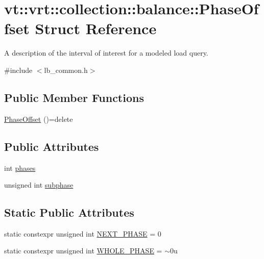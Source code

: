\hypertarget{structvt_1_1vrt_1_1collection_1_1balance_1_1_phase_offset}{}\section{vt\+:\+:vrt\+:\+:collection\+:\+:balance\+:\+:Phase\+Offset Struct Reference}
\label{structvt_1_1vrt_1_1collection_1_1balance_1_1_phase_offset}


A description of the interval of interest for a modeled load query.  




{\ttfamily \#include $<$lb\+\_\+common.\+h$>$}

\subsection*{Public Member Functions}
\begin{DoxyCompactItemize}
\item 
\hyperlink{structvt_1_1vrt_1_1collection_1_1balance_1_1_phase_offset_a3a8f4f20292bf178c5d5902f405f88d6}{Phase\+Offset} ()=delete
\end{DoxyCompactItemize}
\subsection*{Public Attributes}
\begin{DoxyCompactItemize}
\item 
int \hyperlink{structvt_1_1vrt_1_1collection_1_1balance_1_1_phase_offset_a8548a90b20b426e5986f20beb139d3d1}{phases}
\item 
unsigned int \hyperlink{structvt_1_1vrt_1_1collection_1_1balance_1_1_phase_offset_a61facb996e52cae3e9a8c9d4d3091ee0}{subphase}
\end{DoxyCompactItemize}
\subsection*{Static Public Attributes}
\begin{DoxyCompactItemize}
\item 
static constexpr unsigned int \hyperlink{structvt_1_1vrt_1_1collection_1_1balance_1_1_phase_offset_aa8a8c4379ab878392c4f65212e92f581}{N\+E\+X\+T\+\_\+\+P\+H\+A\+SE} = 0
\item 
static constexpr unsigned int \hyperlink{structvt_1_1vrt_1_1collection_1_1balance_1_1_phase_offset_a0eb2d2db9e2d4329e2f76332c1fb2429}{W\+H\+O\+L\+E\+\_\+\+P\+H\+A\+SE} = $\sim$0u
\end{DoxyCompactItemize}


